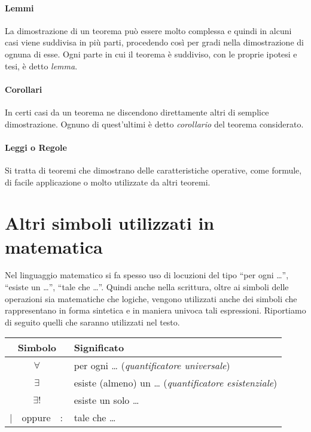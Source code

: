 \paragraph{Lemmi}
La dimostrazione di un teorema può essere molto complessa e quindi in alcuni casi viene suddivisa in più parti, procedendo così per gradi nella dimostrazione di ognuna di esse. Ogni parte in cui il teorema è suddiviso, con le proprie ipotesi e tesi, è detto \emph{lemma}.

\paragraph{Corollari}
In certi casi da un teorema ne discendono direttamente altri di semplice dimostrazione. Ognuno di quest'ultimi è detto \emph{corollario} del teorema considerato.

\paragraph{Leggi o Regole}
Si tratta di teoremi che dimostrano delle caratteristiche operative, come formule, di facile applicazione o molto utilizzate da altri teoremi.


\section{Altri simboli utilizzati in matematica}

Nel linguaggio matematico si fa spesso uso di locuzioni del tipo ``per ogni \ldots'', ``esiste un \ldots'',  ``tale che \ldots''. Quindi anche nella scrittura, oltre ai simboli delle operazioni sia matematiche che logiche, vengono utilizzati anche dei simboli che rappresentano in forma sintetica e in maniera univoca tali espressioni. Riportiamo di seguito quelli che saranno utilizzati nel testo.

\begin{table}[!hb]
\begin{center}
\begin{tabular}{cl}
\toprule
Simbolo & Significato\\
\midrule
$\forall$ & per ogni \ldots{} (\emph{quantificatore universale}) \\
$\exists$ & esiste (almeno) un \ldots{} (\emph{quantificatore esistenziale}) \\
$\exists!$ & esiste un solo \ldots \\
$|$~~oppure~~$:$ & tale che \ldots \\
\bottomrule
\end{tabular}
\end{center}
\end{table}

